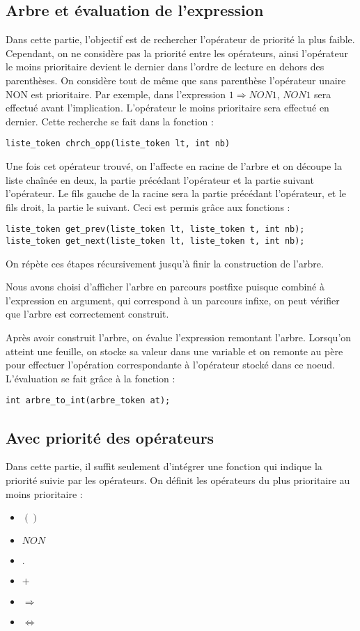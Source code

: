 \documentclass[11pt]{article}
\begin{document}
\subsection{Arbre et évaluation de l'expression}
Dans cette partie, l'objectif est de rechercher l'opérateur de priorité la plus faible. Cependant, on ne considère pas la priorité entre les opérateurs, ainsi l'opérateur le moins prioritaire devient le dernier dans l'ordre de lecture en dehors des parenthèses. On considère tout de même que sans parenthèse l'opérateur unaire NON est prioritaire. Par exemple, dans l'expression $1\Rightarrow NON 1$, $NON 1$ sera effectué avant l'implication. L'opérateur le moins prioritaire sera effectué en dernier. Cette recherche se fait dans la fonction :
\begin{verbatim}
liste_token chrch_opp(liste_token lt, int nb)
\end{verbatim}
\noindent Une fois cet opérateur trouvé, on l'affecte en racine de l'arbre et on découpe la liste chaînée en deux, la partie précédant l'opérateur et la partie suivant l'opérateur. Le fils gauche de la racine sera la partie précédant l'opérateur, et le fils droit, la partie le suivant. Ceci est permis grâce aux fonctions :
\begin{verbatim}
liste_token get_prev(liste_token lt, liste_token t, int nb);
liste_token get_next(liste_token lt, liste_token t, int nb);
\end{verbatim}
On répète ces étapes récursivement jusqu'à finir la construction de l'arbre.

\noindent Nous avons choisi d'afficher l'arbre en parcours postfixe puisque combiné à l'expression en argument, qui correspond à un parcours infixe, on peut vérifier que l'arbre est correctement construit.
\bigskip

\noindent Après avoir construit l'arbre, on évalue l'expression remontant l'arbre. Lorsqu'on atteint une feuille, on stocke sa valeur dans une variable et on remonte au père pour effectuer l'opération correspondante à l'opérateur stocké dans ce noeud. L'évaluation se fait grâce à la fonction : 
\begin{verbatim}
int arbre_to_int(arbre_token at);
\end{verbatim}
\newpage

\subsection{Avec priorité des opérateurs}
Dans cette partie, il suffit seulement d'intégrer une fonction qui indique la priorité suivie par les opérateurs. On définit les opérateurs du plus prioritaire au moins prioritaire : 
\begin{itemize}
    \item $()$ 
    \item $NON$ 
    \item $.$ 
    \item $+$ 
    \item $\Rightarrow$ 
    \item $\Leftrightarrow$
\end{itemize}
\end{document}
